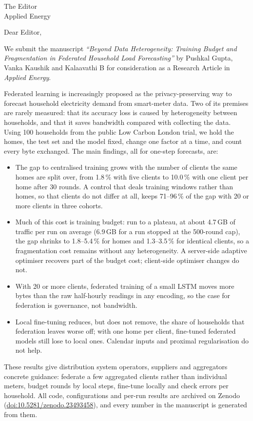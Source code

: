 \documentclass[11pt]{letter}
\date{\today}
\begin{document}
\begin{letter}{The Editor\\Applied Energy}
\opening{Dear Editor,}

We submit the manuscript \emph{``Beyond Data Heterogeneity: Training Budget and Fragmentation in Federated Household Load Forecasting''} by Pushkal Gupta, Vanka Kaushik and Kalaavathi B for consideration as a
Research Article in \emph{Applied Energy}.

Federated learning is increasingly proposed as the privacy-preserving way to forecast household electricity demand
from smart-meter data. Two of its premises are rarely measured: that its accuracy loss is caused by heterogeneity
between households, and that it saves bandwidth compared with collecting the data. Using 100 households from the
public Low Carbon London trial, we hold the homes, the test set and the model fixed, change one factor at a time, and
count every byte exchanged. The main findings, all for one-step forecasts, are:
\begin{itemize}
\item The gap to centralised training grows with the number of clients the same homes are split over, from 1.8\,\% with
five clients to 10.0\,\% with one client per home after 30 rounds. A control that deals training windows rather than
homes, so that clients do not differ at all, keeps 71--96\,\% of the gap with 20 or more clients in three cohorts.
\item Much of this cost is training budget: run to a plateau, at about 4.7\,GB of traffic per run on average (6.9\,GB for a run stopped at the 500-round cap), the gap shrinks to
1.8--5.4\,\% for homes and 1.3--3.5\,\% for identical clients, so a fragmentation cost remains without any
heterogeneity. A server-side adaptive optimiser recovers part of the budget cost; client-side optimiser changes do not.
\item With 20 or more clients, federated training of a small LSTM moves more bytes than the raw half-hourly readings in
any encoding, so the case for federation is governance, not bandwidth.
\item Local fine-tuning reduces, but does not remove, the share of households that federation leaves worse off; with
one home per client, fine-tuned federated models still lose to local ones. Calendar inputs and proximal
regularisation do not help.
\end{itemize}
These results give distribution system operators, suppliers and aggregators concrete guidance: federate a few
aggregated clients rather than individual meters, budget rounds by local steps, fine-tune locally and check errors
per household. All code, configurations and per-run results are archived on Zenodo (\href{https://doi.org/10.5281/zenodo.23493458}{doi:10.5281/zenodo.23493458}),
and every number in the manuscript is generated from them.


\end{letter}
\end{document}
